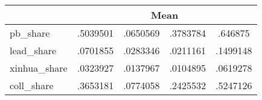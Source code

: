 {
\def\sym#1{\ifmmode^{#1}\else\(^{#1}\)\fi}
\begin{tabular}{l*{1}{cccc}}
\hline\hline
            &\multicolumn{4}{c}{Mean}                           \\
\hline
pb\_share    &    .5039501&    .0650569&    .3783784&     .646875\\
lead\_share  &    .0701855&    .0283346&    .0211161&    .1499148\\
xinhua\_share&    .0323927&    .0137967&    .0104895&    .0619278\\
coll\_share  &    .3653181&    .0774058&    .2425532&    .5247126\\
\hline\hline
\end{tabular}
}
